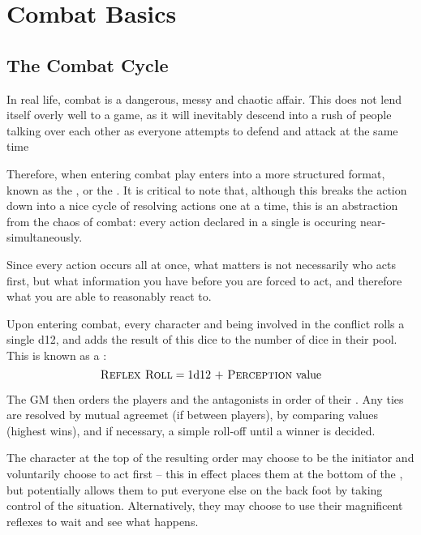 
\chapter{Combat Basics}

\section{The Combat Cycle}

In real life, combat is a dangerous, messy and chaotic affair. This does not lend itself overly well to a game, as it will inevitably descend into a rush of people talking over each other as everyone attempts to defend and attack at the same time 

Therefore, when entering combat play enters into a more structured format, known as the , or the . It is critical to note that, although this breaks the action down into a nice cycle of resolving actions one at a time, this is an abstraction from the chaos of combat: every action declared in a single  is occuring near-simultaneously.

Since every action occurs all at once, what matters is not necessarily who acts first, but what information you have before you are forced to act, and therefore what you are able to reasonably react to.

Upon entering combat, every character and being involved in the conflict rolls a single d12, and adds the result of this dice to the number of dice in their  pool. This is known as a :
$$ \text{\textsc{Reflex Roll}} = \text{1d12 + \textsc{Perception} value} $$

The GM then orders the players and the antagonists in order of their . Any ties are resolved by mutual agreemet (if between players), by comparing  values (highest wins), and if necessary, a simple roll-off until a winner is decided.

The character at the top of the resulting  order may choose to be the initiator and voluntarily choose to act first -- this in effect places them at the bottom of the , but potentially allows them to put everyone else on the back foot by taking control of the situation. Alternatively, they may choose to use their magnificent reflexes to wait and see what happens.

